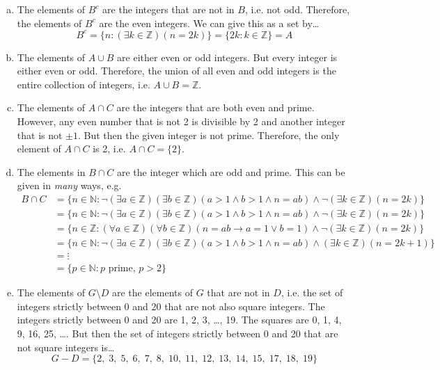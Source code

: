 \documentclass[11pt,letterpaper]{article}
\begin{document}
\sol
\begin{enumerate}[(a)]
\item The elements of $B^c$ are the integers that are not in $B$, i.e. not odd. Therefore, the elements of $B^c$ are the even integers. We can give this as a set by\dots
	\[
	B^c= \{ n \colon (\exists k \in \mathbb{Z})(n= 2k) \}= \{ 2k \colon k \in \mathbb{Z} \}= A
	\]

\item The elements of $A \cup B$ are either even or odd integers. But every integer is either even or odd. Therefore, the union of all even and odd integers is the entire collection of integers, i.e. $A \cup B= \mathbb{Z}$. \pspace

\item The elements of $A \cap C$ are the integers that are both even and prime. However, any even number that is not 2 is divisible by 2 and another integer that is not $\pm 1$. But then the given integer is not prime. Therefore, the only element of $A \cap C$ is 2, i.e. $A \cap C= \{ 2 \}$. \pspace

\item The elements in $B \cap C$ are the integer which are odd and prime. This can be given in \textit{many} ways, e.g.
	\[
	\begin{aligned}
	B \cap C&= \{ n \in \mathbb{N} \colon \neg(\exists a \in \mathbb{Z})(\exists b \in \mathbb{Z})(a > 1 \wedge b > 1 \wedge n= ab) \wedge \neg(\exists k \in \mathbb{Z})(n= 2k) \} \\
	 &= \{ n \in \mathbb{N} \colon \neg(\exists a \in \mathbb{Z})(\exists b \in \mathbb{Z})(a > 1 \wedge b > 1 \wedge n= ab) \wedge \neg(\exists k \in \mathbb{Z})(n= 2k) \} \\
	 &= \{ n \in \mathbb{Z} \colon (\forall a \in \mathbb{Z})(\forall b \in \mathbb{Z})(n= ab \to a= 1 \vee b= 1) \wedge \neg(\exists k \in \mathbb{Z})(n= 2k) \} \\
	 &= \{ n \in \mathbb{N} \colon \neg(\exists a \in \mathbb{Z})(\exists b \in \mathbb{Z})(a > 1 \wedge b > 1 \wedge n= ab) \wedge (\exists k \in \mathbb{Z})(n= 2k + 1) \} \\
	 &= \vdots \\
	&= \{ p \in \mathbb{N} \colon p \text{ prime},\, p > 2 \} 
	\end{aligned}
	\] \pspace

\item The elements of $G \setminus D$ are the elements of $G$ that are not in $D$, i.e. the set of integers strictly between 0 and 20 that are not also square integers. The integers strictly between 0 and 20 are 1, 2, 3, \ldots, 19. The squares are 0, 1, 4, 9, 16, 25, \ldots. But then the set of integers strictly between 0 and 20 that are not square integers is\dots
	\[
	G - D= \{ 2, \; 3, \; 5, \; 6, \; 7, \; 8, \; 10, \; 11, \; 12, \; 13, \; 14, \; 15, \; 17, \; 18, \; 19 \}
	\] \pspace


\end{enumerate}
\end{document}

